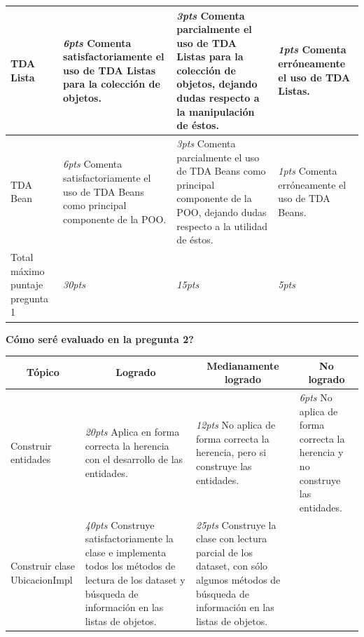 \documentclass[10pt]{article}
\begin{document}
{\begin{center}
\begin{tabular}{|p{2cm}|p{4cm}|p{4cm}|p{4cm}|}
                TDA Lista & 
                \emph{6pts} Comenta satisfactoriamente el uso de TDA Listas para la colecci\'on de objetos. & 
                \emph{3pts} Comenta parcialmente el uso de TDA Listas para la colecci\'on de objetos, dejando dudas respecto a la manipulaci\'on de \'estos. & 
                \emph{1pts} Comenta err\'oneamente el uso de TDA Listas. \\ \hline
                TDA Bean & 
                \emph{6pts} Comenta satisfactoriamente el uso de TDA Beans como principal componente de la POO. & 
                \emph{3pts} Comenta parcialmente el uso de TDA Beans como principal componente de la POO, dejando dudas respecto a la utilidad de \'estos. & 
                \emph{1pts}  Comenta err\'oneamente el uso de TDA Beans. \\ \hline
                Total m\'aximo puntaje pregunta 1 & 
                \emph{30pts} & 
                \emph{15pts} & 
                \emph{5pts} \\ \hline
            \end{tabular}
        \end{center}
        \vspace*{-20pt}
        \begin{center}
            \textbf{\textquestiondown C\'omo ser\'e evaluado en la pregunta 2?} \linebreak
            \begin{tabular}{|p{2cm}|p{4cm}|p{4cm}|p{4cm}|}\hline
                \multicolumn{1}{|c|}{\textbf{T\'opico}} & 
                \multicolumn{1}{c|}{\textbf{Logrado}} & 
                \multicolumn{1}{c|}{\textbf{Medianamente logrado}} & 
                \multicolumn{1}{c|}{\textbf{No logrado}} \\ \hline
                Construir entidades & 
                \emph{20pts} Aplica en forma correcta la herencia con el desarrollo de las entidades. & 
                \emph{12pts} No aplica de forma correcta la herencia, pero si construye las entidades. & 
                \emph{6pts} No aplica de forma correcta la herencia y no construye las entidades. \\ \hline
                Construir clase UbicacionImpl & 
                \emph{40pts} Construye satisfactoriamente la clase e implementa todos los m\'etodos de lectura de los dataset y b\'usqueda de informaci\'on en las listas de objetos. & 
                \emph{25pts} Construye la clase con lectura parcial de los dataset, con s\'olo algunos m\'etodos de b\'usqueda de informaci\'on en las listas de objetos. & 

\end{tabular}
\end{center}}
\end{document}
